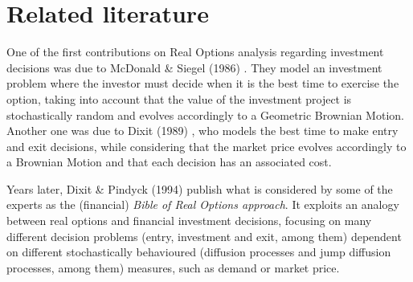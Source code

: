 
\section{Related literature}


One of the first contributions on Real Options analysis regarding investment decisions was due to McDonald \& Siegel (1986)  \cite{siegel}. They model an investment problem where the investor must decide when it is the best time to exercise the option, taking into account that the value of the investment project is stochastically random and evolves accordingly to a Geometric Brownian Motion. Another one was due to Dixit (1989) \cite{dixit_alone}, who models the best time to make entry and exit decisions, while considering that the market price evolves accordingly to a Brownian Motion and that each decision has an associated cost.

Years later, Dixit \& Pindyck (1994) \cite{dixit:book} publish what is considered by some of the experts as the (financial) \textit{Bible of Real Options approach}. It exploits an analogy between real options and financial investment decisions, focusing on many different decision problems (entry, investment and exit, among them) dependent on different stochastically behavioured (diffusion processes and jump diffusion processes, among them) measures, such as demand or market price.


